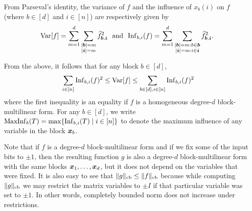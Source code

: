 From Parseval's identity, the variance of $f$ and the influence of $x_b(i)$ on $f$ (where $b \in [d]$ and $i \in [n]$) are respectively given by 
\[ \mathrm{Var}[f] =  \sum_{m=1}^d \sum_{\substack{|\boldsymbol{b}|=m\\ |{\boldsymbol{i}}|=m}} \widehat{f}_{\boldsymbol{b},{\boldsymbol{i}}}^2 ~\text{ and }~ \mathrm{Inf}_{b,i}(f) = \sum_{m=1}^d \sum_{\substack{|\boldsymbol{b}|=m : b\in \boldsymbol{b} \\|{\boldsymbol{i}}|=m:i \in {\boldsymbol{i}}}} \widehat{f}_{\boldsymbol{b},{\boldsymbol{i}}}^2.\]

From the above, it follows that for any block $b \in [d]$, 
\begin{align}\label{eqn:inf-tensor}
  \  \sum_{i \in [n]} \mathrm{Inf}_{b,i}(f)^2 \le \mathrm{Var}[f] \le \sum_{b \in [d], i \in [n]} \mathrm{Inf}_{b,i}(f)^2 
\end{align}
where the first inequality is an equality if $f$ is a homogeneous degree-$d$ block-multilinear form. For any $b \in [d]$, we write $\mathrm{MaxInf}_b(T) = \max \{ \mathrm{Inf}_{b,i}(T)  \mid i \in [n]\}$ to denote the maximum influence of any variable in the block $\boldsymbol{x}_b$.


Note that if $f$ is a degree-$d$ block-multilinear form and if we fix some of the input bits to $\pm 1$, then the resulting function $g$ is also a degree-$d$ block-multilinear form with the same blocks $\boldsymbol{x}_1, \ldots, \boldsymbol{x}_d$, but it does not depend on the variables that were fixed. It is also easy to see that $\|g\|_{\mathrm{cb}} \le \|f\|_{\mathrm{cb}}$ because while computing $\|g\|_{\mathrm{cb}}$ we may restrict the matrix variables to $\pm I$ if that particular variable was set to $\pm 1$. In other words, completely bounded norm does not increase under restrictions.




